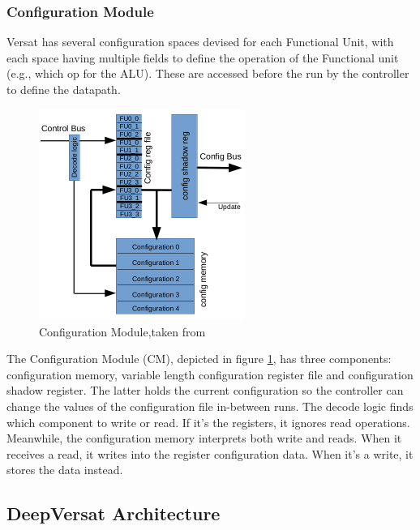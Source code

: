 \subsubsection{Configuration Module}
\quad Versat has several configuration spaces devised for each Functional Unit,
with each space having multiple fields to define the operation of the Functional unit (e.g., which op for the ALU).
These are accessed before the run by the controller to define the datapath.

\begin{figure}[!htbp]
    \centering
    \includegraphics[width=0.6\textwidth]{Figures/conf.png}
    \caption{Configuration Module,taken from~\cite{sousa:controller}}
    \label{figure:conf}
\end{figure} 

The Configuration Module (CM), depicted in figure \ref{figure:conf}, 
has three components: configuration memory, variable length configuration register file 
and configuration shadow register.
The latter holds the current configuration so the controller can change the values of the configuration file in-between runs.
The decode logic finds which component to write or read. If it's the registers, it ignores read operations.
Meanwhile, the configuration memory interprets both write and reads. When it receives a read,
it writes into the register configuration data. When it's a write, it stores the data instead.


\newpage
\subsection{DeepVersat Architecture}


